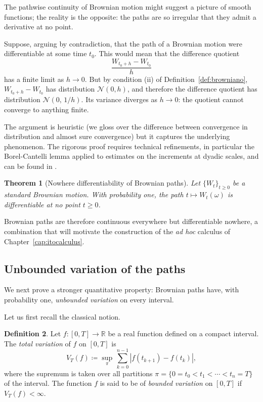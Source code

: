 \documentclass[11pt,a4paper,oneside]{report}
\theoremstyle{plain}
\newtheorem{teorema}{Theorem}[chapter]
\theoremstyle{definition}
\newtheorem{definicion}[teorema]{Definition}
\theoremstyle{remark}
\newcommand{\R}{\mathbb{R}}
\newcommand{\1}{\mathbf{1}}
\newcommand{\eqdef}{\coloneqq}
\begin{document}
The pathwise continuity of Brownian motion might suggest a picture of
smooth functions; the reality is the opposite: the paths are so
irregular that they admit a derivative at no point.

Suppose, arguing by
contradiction, that the path of a Brownian motion were
differentiable at some time $t_0$. This would mean that the
difference quotient
\begin{equation*}
  \frac{W_{t_0 + h} - W_{t_0}}{h}
\end{equation*}
has a finite limit as $h \to 0$. But by condition (ii) of
Definition~\ref{def:browniano}, $W_{t_0+h} - W_{t_0}$ has distribution
$\mathcal{N}(0, h)$, and therefore the difference quotient has
distribution $\mathcal{N}(0,\, 1/h)$. Its variance diverges as
$h \to 0$: the quotient cannot converge to anything finite.

The argument is heuristic (we gloss over the difference between
convergence in distribution and almost sure convergence) but it
captures the underlying phenomenon. The rigorous proof requires
technical refinements, in particular the Borel-Cantelli lemma applied
to estimates on the increments at dyadic scales, and can be found in
\cite{karatzas-shreve}.

\begin{teorema}[Nowhere differentiability of Brownian paths]
\label{teo:no_diferenciabilidad}
Let $\{W_t\}_{t \geq 0}$ be a standard Brownian motion. With
probability one, the path $t \mapsto W_t(\omega)$ is differentiable at
no point $t \geq 0$.
\end{teorema}

Brownian paths are therefore continuous everywhere but differentiable
nowhere, a combination that will motivate the construction of the
\emph{ad hoc} calculus of Chapter~\ref{cap:itocalculus}.

\subsection{Unbounded variation of the paths}
\label{subsec:variacion_no_acotada}

We next prove a stronger quantitative property: Brownian paths have,
with probability one, \emph{unbounded variation} on every interval.

Let us first recall
the classical notion.

\begin{definicion}
\label{def:variacion_total}
Let $f : [0, T] \to \R$ be a real function defined on a compact
interval. The \emph{total variation} of $f$ on $[0, T]$ is
\begin{equation*}
  V_T(f) \eqdef \sup_{\pi}\, \sum_{k=0}^{n-1} |f(t_{k+1}) - f(t_k)|,
\end{equation*}
where the supremum is taken over all partitions
$\pi = \{0 = t_0 < t_1 < \cdots < t_n = T\}$ of the interval. The
function $f$ is said to be of \emph{bounded variation} on $[0, T]$ if
$V_T(f) < \infty$.
\end{definicion}
\end{document}

